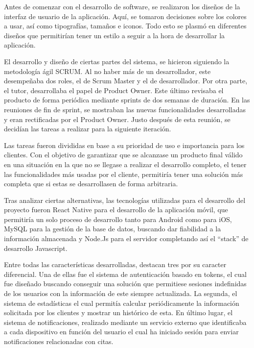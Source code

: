 Antes de comenzar con el desarrollo de software, se realizaron los diseños de la interfaz de usuario de la aplicación. Aquí, se tomaron decisiones sobre los colores a usar, así como tipografías, tamaños e iconos. Todo esto se plasmó en diferentes diseños que permitirían tener un estilo a seguir a la hora de desarrollar la aplicación. 

El desarrollo y diseño de ciertas partes del sistema, se hicieron siguiendo la metodología ágil SCRUM. Al no haber más de un desarrollador, este desempeñaba dos roles, el de Scrum Master y el de desarrollador. Por otra parte, el tutor, desarrollaba el papel de Product Owner. Este último revisaba el producto de forma periódica mediante sprints de dos semanas de duración. En las reuniones de fin de sprint, se mostraban las nuevas funcionalidades desarrolladas y eran rectificadas por el Product Owner. Justo después de esta reunión, se decidían las tareas a realizar para la siguiente iteración. 

Las tareas fueron divididas en base a su prioridad de uso e importancia para los clientes. Con el objetivo de garantizar que se alcanzase un producto final válido en una situación en la que no se llegase a realizar el desarrollo completo, el tener las funcionalidades más usadas por el cliente, permitiría tener una solución más completa que si estas se desarrollasen de forma arbitraria.

Tras analizar ciertas alternativas, las tecnologías utilizadas para el desarrollo del proyecto fueron React Native para el desarrollo de la aplicación móvil, que permitiría un solo proceso de desarrollo tanto para Android como para iOS, MySQL para la gestión de la base de datos, buscando dar fiabilidad a la información almacenada y Node.Js para el servidor completando así el ``stack'' de desarrollo Javascript.

Entre todas las características desarrolladas, destacan tres por su caracter diferencial. Una de ellas fue el sistema de autenticación basado en tokens, el cual fue diseñado buscando conseguir una solución que permitiese sesiones indefinidas de los usuarios con la información de este siempre actualizada. La segunda, el sistema de estadísticas el cual permitía calcular periódicamente la información solicitada por los clientes y mostrar un histórico de esta. En último lugar, el sistema de notificaciones, realizado mediante un servicio externo que identificaba a cada dispositivo en función del usuario el cual ha iniciado sesión para enviar notificaciones relacionadas con citas.

